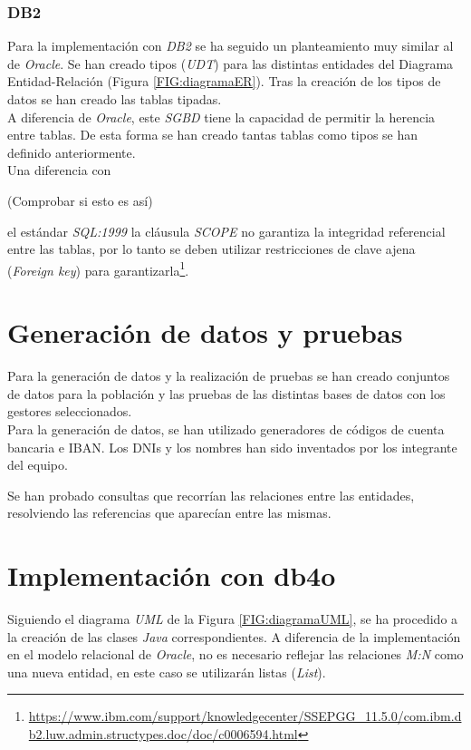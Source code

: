 \documentclass{article}
\begin{document}
\subsubsection{DB2}

Para la implementación con \emph{DB2} se ha seguido un planteamiento muy similar al de \emph{Oracle}. Se han creado tipos (\emph{UDT}) para las distintas entidades del Diagrama Entidad-Relación (Figura \ref{FIG:diagramaER}). Tras la creación de los tipos de datos se han creado las tablas tipadas.\\
A diferencia de \emph{Oracle}, este \emph{SGBD} tiene la capacidad de permitir la herencia entre tablas. De esta forma se han creado tantas tablas como tipos se han definido anteriormente.\\
Una diferencia con 
\begin{Large}
	(Comprobar si esto es así)
\end{Large}
el estándar \emph{SQL:1999} la cláusula \emph{SCOPE} no garantiza la integridad referencial entre las tablas, por lo tanto se deben utilizar restricciones de clave ajena (\emph{Foreign key}) para garantizarla\footnote{\url{https://www.ibm.com/support/knowledgecenter/SSEPGG_11.5.0/com.ibm.db2.luw.admin.structypes.doc/doc/c0006594.html}}.
\\

\section{Generación de datos y pruebas}

Para la generación de datos y la realización de pruebas se han creado conjuntos de datos para la población y las pruebas de las distintas bases de datos con los gestores seleccionados.\\

Para la generación de datos, se han utilizado generadores de códigos de cuenta bancaria e IBAN. Los DNIs y los nombres han sido inventados por los integrante del equipo.

Se han probado consultas que recorrían las relaciones entre las entidades, resolviendo las referencias que aparecían entre las mismas.

\section{Implementación con db4o}

Siguiendo el diagrama \emph{UML} de la Figura \ref{FIG:diagramaUML}, se ha procedido a la creación de las clases \emph{Java} correspondientes. A diferencia de la implementación en el modelo relacional de \emph{Oracle}, no es necesario reflejar las relaciones \emph{M:N} como una nueva entidad, en este caso se utilizarán listas (\emph{List}).\\
\end{document}
